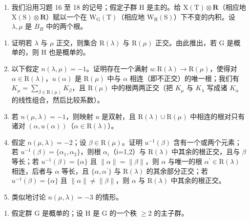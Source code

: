 \begin{enumerate}
\def\labelenumi{\arabic{enumi})}
\setcounter{enumi}{18}
\tightlist
\item
  我们沿用习题 16 至 18 的记号；假定子群 H 是主的。给 \(\mathrm{X(T)\otimes\mathbf{R}}\)（相应地 \(\mathrm{X(S)\otimes\mathbf{R}}\)）赋以一个在 \(\mathrm{W_{G}(T)}\)（相应地 \(\mathrm{W_{H}(S)}\)）下不变的内积。设 \(\lambda,\mu\) 是 \(B_{H}\) 中的两个根。
\end{enumerate}

\begin{enumerate}
\def\labelenumi{\alph{enumi})}
\item
  证明若 \(\lambda\) 与 \(\mu\) 正交，则集合 \(\mathrm{R}(\lambda)\) 与 \(\mathrm{R}(\mu)\) 正交。由此推出，若 \(\mathrm{G}\) 是概单的，则 \(\mathrm{H}\) 也是概单的。
\item
  以下假定 \(n(\lambda, \mu) = -1\)。证明存在一个满射 \(u: \mathrm{R}(\lambda) \to \mathrm{R}(\mu)\)，使得对 \(\alpha \in \mathrm{R}(\lambda)\)，\(u(\alpha)\) 是 \(\mathrm{R}(\mu)\) 中与 \(\alpha\) 相连（即不正交）的唯一根；我们有 \(K_{\mu} = \sum_{\beta \in \mathrm{R}(\mu)} K_{\beta}\)，且 \(\mathrm{R}(\mu)\) 中的根两两正交（把 \(K_{\mu}\) 与 \(K_{\lambda}\) 写成诸 \(K_{\alpha}\) 的线性组合，然后比较系数）。
\item
  若 \(n(\mu, \lambda) = -1\)，则映射 \(u\) 是双射，且 \(\mathrm{R}(\lambda) \cup \mathrm{R}(\mu)\) 中相连的根对只有诸对 \((\alpha, u(\alpha))\)（\(\alpha \in \mathrm{R}(\lambda)\)）。
\item
  假定 \(n(\mu,\lambda)=-2\)；设 \(\beta\in\mathrm{R}(\mu)\)。证明 \(u^{-1}(\beta)\) 含有一个或两个元素；若 \(u^{-1}(\beta)=\{\alpha_{1},\alpha_{2}\}\)，则根 \(\alpha_{i}\)（i=1,2）与 \(\mathrm{R}(\lambda)\) 中其余的根正交，且与 \(\beta\) 等长；若 \(u^{-1}(\beta)=\{\alpha\}\) 且 \(\|\alpha\|=\|\beta\|\)，则 \(\alpha\) 与唯一的根 \(\alpha^{\prime}\in\mathrm{R}(\lambda)\) 相连，后者与 \(\alpha\) 等长，且 \(\{\alpha,\alpha^{\prime}\}\) 与 \(\mathrm{R}(\lambda)\) 的其余部分正交；若 \(u^{-1}(\beta)=\{\alpha\}\) 且 \(\|\alpha\|\neq\|\beta\|\)，则 \(\alpha\) 与 \(\mathrm{R}(\lambda)\) 中其余的根正交。
\item
  类似地讨论 \(n(\mu, \lambda) = -3\) 的情形。
\end{enumerate}

\begin{enumerate}
\def\labelenumi{\arabic{enumi})}
\setcounter{enumi}{19}
\tightlist
\item
  假定群 G 是概单的；设 H 是 G 的一个秩 \(\geq 2\) 的主子群。
\end{enumerate}

